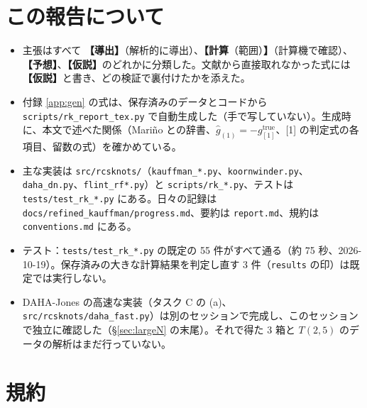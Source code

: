 \documentclass[a4paper,10pt]{ltjsarticle}
\newcommand{\deriv}{\textbf{【導出】}}
\newcommand{\comp}[1]{\textbf{【計算}\if\relax\detokenize{#1}\relax\else（#1）\fi\textbf{】}}
\newcommand{\conj}{\textbf{【予想】}}
\newcommand{\hyp}{\textbf{【仮説】}}
\begin{document}
\section{この報告について}
\begin{itemize}
\item 主張はすべて \deriv（解析的に導出）、\comp{範囲}（計算機で確認）、\conj、\hyp のどれかに分類した。文献から直接取れなかった式には \hyp と書き、どの検証で裏付けたかを添えた。
\item 付録 \ref{app:gen} の式は、保存済みのデータとコードから \texttt{scripts/rk\_report\_tex.py} で自動生成した（手で写していない）。生成時に、本文で述べた関係（Mariño との辞書、$\hat g_{(1)} = -g^{\mathrm{true}}_{[1]}$、[1] の判定式の各項目、留数の式）を確かめている。
\item 主な実装は \texttt{src/rcsknots/}（\texttt{kauffman\_*.py}、\texttt{koornwinder.py}、\texttt{daha\_dn.py}、\texttt{flint\_rf*.py}）と \texttt{scripts/rk\_*.py}、テストは \texttt{tests/test\_rk\_*.py} にある。日々の記録は \texttt{docs/refined\_kauffman/progress.md}、要約は \texttt{report.md}、規約は \texttt{conventions.md} にある。
\item テスト：\texttt{tests/test\_rk\_*.py} の既定の 55 件がすべて通る（約 75 秒、2026-10-19）。保存済みの大きな計算結果を判定し直す 3 件（\texttt{results} の印）は既定では実行しない。
\item DAHA-Jones の高速な実装（タスク C の (a)、\texttt{src/rcsknots/daha\_fast.py}）は別のセッションで完成し、このセッションで独立に確認した（§\ref{sec:largeN} の末尾）。それで得た 3 箱と $T(2,5)$ のデータの解析はまだ行っていない。
\end{itemize}

\section{規約}\label{sec:conv}
\end{document}
